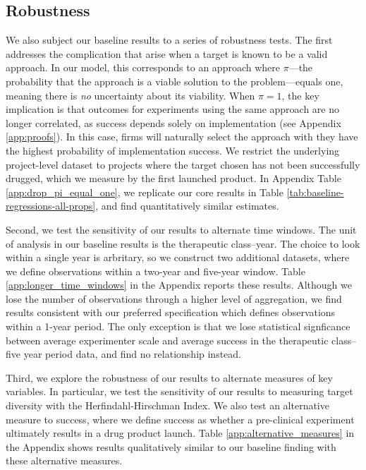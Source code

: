 
\subsection{Robustness}

We also subject our baseline results to a series of robustness tests. The first addresses the complication that arise when a target is known to be a valid approach. In our model, this corresponds to an approach where $\pi$—the probability that the approach is a viable solution to the problem—equals one, meaning there is \emph{no} uncertainty about its viability. When $\pi=1$, the key implication is that outcomes for experiments using the same approach are no longer correlated, as success depends solely on implementation (see Appendix \ref{app:proofs}). In this case, firms will naturally select the approach with they have the highest probability of implementation success. We restrict the underlying project-level dataset to projects where the target chosen has not been successfully drugged, which we measure by the first launched product. In Appendix Table \ref{app:drop_pi_equal_one}, we replicate our core results in Table \ref{tab:baseline-regressions-all-props}, and find quantitatively similar estimates.

Second, we test the sensitivity of our results to alternate time windows. The unit of analysis in our baseline results is the therapeutic class--year. The choice to look within a single year is arbritary, so we construct two additional datasets, where we define observations within a two-year and five-year window. Table \ref{app:longer_time_windows} in the Appendix reports these results. Although we lose the number of observations through a higher level of aggregation, we find results consistent with our preferred specification which defines observations within a 1-year period. The only exception is that we lose statistical signficance between average experimenter scale and average success in the therapeutic class--five year period data, and find no relationship instead.

Third, we explore the robustness of our results to alternate measures of key variables. In particular, we test the sensitivity of our results to measuring target diversity with the Herfindahl-Hirschman Index. We also test an alternative measure to success, where we define success as whether a pre-clinical experiment ultimately results in a drug product launch. Table \ref{app:alternative_measures} in the Appendix shows results qualitatively similar to our baseline finding with these alternative measures.


